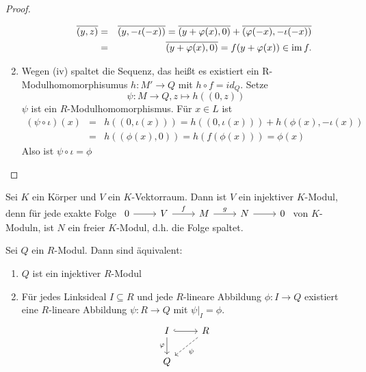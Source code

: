 \begin{proof}
\begin{enumerate}
\begin{itemize}
			\begin{eqnarray*}
				 \overline{(y,z)} &=& \overline{(y, -\iota(-x))} = \overline{(y+\varphi(x), 0)} +\overline{(\varphi(-x), -\iota(-x))}\\
				 & =& \overline{(y+\varphi(x), 0)} = f(y+ \varphi(x)) \in \operatorname{im} f.
			\end{eqnarray*}
		\end{itemize}
	\item Wegen (iv) spaltet die Sequenz, das heißt es existiert ein R-Modulhomomorphisumus $ h: M' \to Q $ mit $h \circ f = id_Q$. Setze $$\psi: M \to Q, z \mapsto h((0,z))$$
	$\psi $ ist ein $R$-Modulhomomorphismus. Für $x \in L $ ist \begin{eqnarray*}
		(\psi \circ \iota)(x)& =& h((0,\iota(x))) = h((0, \iota(x))) + h(\phi(x),-\iota(x))\\
		& =& h((\phi(x),0)) = h(f(\phi(x))) = \phi(x)
		\end{eqnarray*}
	Also ist $\psi \circ \iota = \phi$
	
	\end{enumerate}
\end{proof}
\begin{bsp}
	Sei $K$ ein Körper und $V$ ein $K$-Vektorraum. Dann ist $V$ ein injektiver $K$-Modul, denn für jede exakte Folge $\begin{tikzcd}	0  \arrow{r} & V \arrow{r}{f} & M \arrow{r}{g} & N \arrow{r} & 0 \end{tikzcd}$ von $K$-Moduln, ist $N$ ein freier $K$-Modul, d.h. die Folge spaltet.
\end{bsp}
\begin{sa}\label{6.9} Sei $Q$ ein $R$-Modul. Dann sind äquivalent: 
	\begin{enumerate} [label= \roman*)]
		\item $Q$ ist ein injektiver $R$-Modul
		\item Für jedes Linksideal $I \subseteq R $ und jede $R$-lineare Abbildung $\phi: I \to Q $ existiert eine $R$-lineare Abbildung $\psi: R \to Q $ mit $ \psi\big|_{I} = \phi$. 
		$$\begin{tikzcd}
		I \arrow[hook]{r}\arrow[swap]{d}{\phi} & R\arrow[dashed]{dl}{\psi} \\Q &
		\end{tikzcd}$$
	\end{enumerate}
\end{sa}
